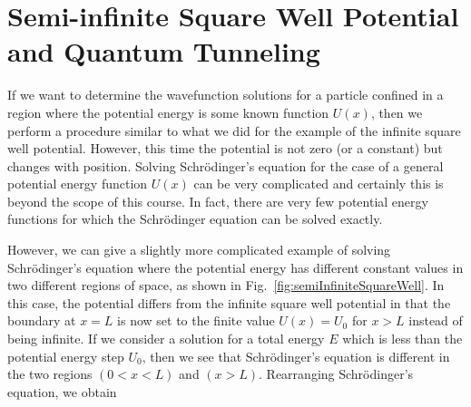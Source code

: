 

\section[Semi-infinite Square Well and Tunneling]{Semi-infinite Square Well Potential and Quantum Tunneling}
\label{sec:semi_infinite_sq_well}

If we want to determine the wavefunction solutions for a particle confined
in a region where the potential energy is some known function $U(x)$,
then we perform a procedure similar to what we did for the example of the
infinite square well potential. However, this time the potential is not
zero (or a constant) but changes with position.  Solving Schr\"odinger's
equation for the case of a general potential energy function $U(x)$
can be very complicated and certainly this is beyond the scope of this
course. In fact, there are very few potential energy functions for which
the Schr\"odinger equation can be solved exactly.

However, we can give a slightly more complicated example of solving
Schr\"odinger's equation where the potential energy has different
constant values in two different regions of space, as shown in
Fig.~\ref{fig:semiInfiniteSquareWell}. In this case, the potential
differs from the infinite square well potential in that the boundary
at $x = L$ is now set to the finite value $U(x) = U_0$ for $x > L$
instead of being infinite. If we consider a solution for a total
energy $E$ which is less than the potential energy step $U_0$, then we
see that Schr\"{o}dinger's equation is different in the two regions $(0
< x < L)$ and $(x > L)$.  Rearranging Schr\"{o}dinger's equation, we
obtain

